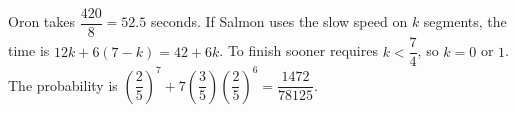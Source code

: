 Oron takes $\dfrac{420}{8}=52.5$ seconds. If Salmon uses the slow speed on $k$ segments, the time is $12k+6(7-k)=42+6k$. To finish sooner requires $k<\dfrac{7}{4}$, so $k=0$ or $1$. The probability is $\left(\dfrac{2}{5}\right)^7+7\left(\dfrac{3}{5}\right)\left(\dfrac{2}{5}\right)^6=\boxed{\dfrac{1472}{78125}}$.
